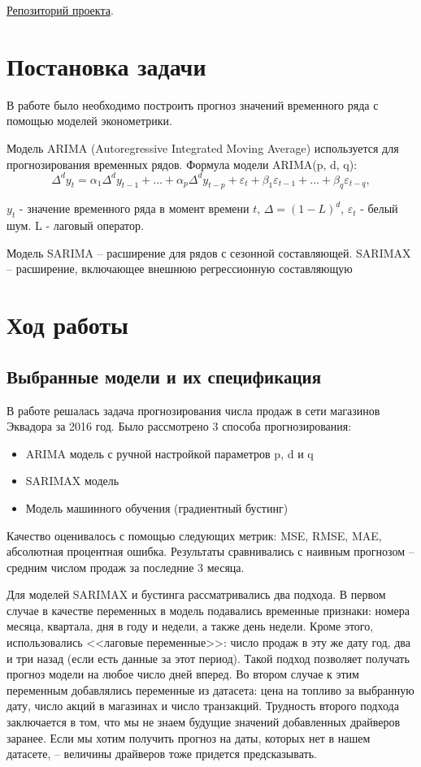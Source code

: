 \documentclass[]{article}
\begin{document}
{
	\Large
	\href{https://github.com/MaximKiryakin/Vega/tree/main/%D0%A4%D0%B8%D0%BD%D0%B0%D0%BD%D1%81%D0%BE%D0%B2%D0%B0%D1%8F%20%D1%8D%D0%BA%D0%BE%D0%BD%D0%BE%D0%BC%D0%B5%D1%82%D1%80%D0%B8%D0%BA%D0%B0/%D0%9F%D1%80%D0%BE%D0%B5%D0%BA%D1%82%201}{Репозиторий проекта}.
}

\section{Постановка задачи}

В работе было необходимо построить прогноз значений временного ряда с помощью моделей эконометрики. 

Модель ARIMA (Autoregressive Integrated Moving Average) используется для прогнозирования временных рядов.
Формула модели ARIMA(p, d, q):
$$
\Delta^d y_t = \alpha_1 \Delta^d y_{t-1} + ... + \alpha_p\Delta^dy_{t-p} + \varepsilon_t + \beta_1\varepsilon_{t-1} + ... + \beta_q\varepsilon_{t-q},
$$

$y_t$ - значение временного ряда в момент времени $t$, $\Delta = (1 - L)^d$, $\varepsilon_t$ - белый шум. L - лаговый оператор.

Модель SARIMA – расширение для рядов с сезонной составляющей. SARIMAX – расширение, включающее внешнюю регрессионную составляющую


\section{Ход работы}
\subsection{Выбранные модели и их спецификация}
В работе решалась задача прогнозирования числа продаж в сети магазинов Эквадора за 2016 год. Было рассмотрено 3 способа прогнозирования:
\begin{itemize}
	\item ARIMA модель с ручной настройкой параметров p, d и q
	\item SARIMAX модель
	\item Модель машинного обучения (градиентный бустинг)
\end{itemize}


Качество оценивалось с помощью следующих метрик: MSE, RMSE, MAE, абсолютная процентная ошибка. Результаты сравнивались с наивным прогнозом -- средним числом продаж за последние 3 месяца. 

Для моделей SARIMAX и бустинга рассматривались два подхода. В первом случае в качестве переменных в модель подавались временные признаки: номера месяца, квартала, дня в году и недели, а также день недели.
Кроме этого, использовались <<лаговые переменные>>: число продаж в эту же дату год, два и три назад (если есть данные за этот период). Такой подход позволяет получать прогноз модели на любое число дней вперед. Во втором случае к этим переменным добавлялись переменные из датасета: цена на топливо за выбранную дату, число акций в магазинах и число транзакций. Трудность второго подхода заключается в том, что мы не знаем будущие значений добавленных драйверов заранее. Если мы хотим получить прогноз на даты, которых нет в нашем датасете, -- величины драйверов тоже придется предсказывать.
\end{document}
